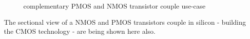 \begin{center}
    \begin{figure}[h] \caption{complementary PMOS and NMOS transistor couple use-case}
        \begin{circuitdiagram}[draft*]{20}{20}
        \end{circuitdiagram}
    \end{figure}
\end{center}

The sectional view of a NMOS and PMOS transistors couple in silicon - building the CMOS technology - are being shown here also.
\begin{center}
\end{center}



